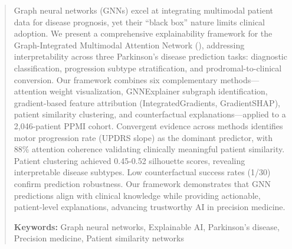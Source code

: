 \begin{abstract}
Graph neural networks (GNNs) excel at integrating multimodal patient data for disease prognosis, yet their ``black box'' nature limits clinical adoption. We present a comprehensive explainability framework for the Graph-Integrated Multimodal Attention Network (\giman), addressing interpretability across three Parkinson's disease prediction tasks: diagnostic classification, progression subtype stratification, and prodromal-to-clinical conversion. Our framework combines six complementary methods—attention weight visualization, GNNExplainer subgraph identification, gradient-based feature attribution (IntegratedGradients, GradientSHAP), patient similarity clustering, and counterfactual explanations—applied to a 2,046-patient PPMI cohort. Convergent evidence across methods identifies motor progression rate (UPDRS slope) as the dominant predictor, with 88\% attention coherence validating clinically meaningful patient similarity. Patient clustering achieved 0.45-0.52 silhouette scores, revealing interpretable disease subtypes. Low counterfactual success rates (1/30) confirm prediction robustness. Our framework demonstrates that GNN predictions align with clinical knowledge while providing actionable, patient-level explanations, advancing trustworthy AI in precision medicine.

\noindent\textbf{Keywords:} Graph neural networks, Explainable AI, Parkinson's disease, Precision medicine, Patient similarity networks
\end{abstract}
